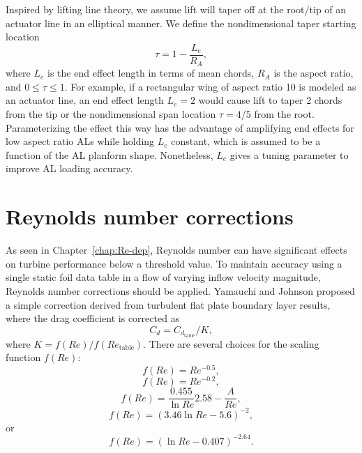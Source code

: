 Inspired by lifting line theory, we assume lift will taper off at the root/tip
of an actuator line in an elliptical manner. We define the nondimensional taper
starting location
\begin{equation}
    \tau = 1 - \frac{L_e}{R_A}, 
    \label{eq:end-length}
\end{equation}
where $L_e$ is the end effect length in terms of mean chords, $R_A$ is the
aspect ratio, and $0 \le \tau \le 1$. For example, if a rectangular wing of
aspect ratio 10 is modeled as an actuator line, an end effect length $L_e = 2$
would cause lift to taper 2 chords from the tip or the nondimensional span
location $\tau = 4/5$ from the root. Parameterizing the effect this way has the
advantage of amplifying end effects for low aspect ratio ALs while holding $L_e$
constant, which is assumed to be a function of the AL planform shape.
Nonetheless, $L_e$ gives a tuning parameter to improve AL loading accuracy.


\section{Reynolds number corrections}

As seen in Chapter~\ref{chap:Re-dep}, Reynolds number can have significant
effects on turbine performance below a threshold value. To maintain accuracy
using a single static foil data table in a flow of varying inflow velocity
magnitude, Reynolds number corrections should be applied. Yamauchi and Johnson
\cite{Yamauchi1983} proposed a simple correction derived from turbulent flat
plate boundary layer results, where the drag coefficient is corrected as
\begin{equation}
C_d = C_{d_{\mathrm{table}}}/ K,
\label{eq:cd-correction}
\end{equation}
where $K = f(Re)/f(Re_\mathrm{table})$. There are several choices for the
scaling function $f(Re)$:
\begin{equation}
f(Re) = Re^{-0.5},
\end{equation}
\begin{equation}
f(Re) = Re^{-0.2},
\end{equation}
\begin{equation}
f(Re) = \frac{0.455}{\ln Re}2.58 - \frac{A}{Re},
\end{equation}
\begin{equation}
f(Re) = (3.46 \ln Re - 5.6)^{-2},
\end{equation}
or
\begin{equation}
f(Re) = (\ln Re - 0.407)^{-2.64}.
\end{equation}

